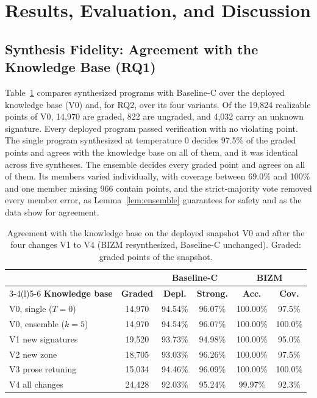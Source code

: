 \documentclass[final,5p]{elsarticle}
\begin{document}
\section{Results, Evaluation, and Discussion}
\label{sec:results_discussion}

\subsection{Synthesis Fidelity: Agreement with the Knowledge Base (RQ1)}
\label{sec:compiled_fidelity}

Table~\ref{tab:agreement} compares synthesized programs with Baseline-C over the deployed knowledge base (V0) and, for RQ2, over its four variants. Of the 19,824 realizable points of V0, 14,970 are graded, 822 are ungraded, and 4,032 carry an unknown signature. Every deployed program passed verification with no violating point. The single program synthesized at temperature 0 decides 97.5\% of the graded points and agrees with the knowledge base on all of them, and it was identical across five syntheses. The ensemble decides every graded point and agrees on all of them. Its members varied individually, with coverage between 69.0\% and 100\% and one member missing 966 contain points, and the strict-majority vote removed every member error, as Lemma~\ref{lem:ensemble} guarantees for safety and as the data show for agreement.

\begin{table}[t]
    \centering
    \caption{Agreement with the knowledge base on the deployed snapshot V0 and after the four changes V1 to V4 (BIZM resynthesized, Baseline-C unchanged). Graded: graded points of the snapshot.}
    \label{tab:agreement}
    \scriptsize
    \setlength{\tabcolsep}{1.8pt}
    \begin{tabular}{@{}lccccc@{}}
        \toprule
        & & \multicolumn{2}{c}{\textbf{Baseline-C}} & \multicolumn{2}{c}{\textbf{BIZM}} \\
        \cmidrule(lr){3-4}\cmidrule(l){5-6}
        \textbf{Knowledge base} & \textbf{Graded} & \textbf{Depl.} & \textbf{Strong.} & \textbf{Acc.} & \textbf{Cov.} \\
        \midrule
        V0, single ($T{=}0$) & 14,970 & 94.54\% & 96.07\% & 100.00\% & 97.5\%  \\
        V0, ensemble ($k{=}5$) & 14,970 & 94.54\% & 96.07\% & 100.00\% & 100.0\% \\
        V1 new signatures            & 19,520 & 93.73\% & 94.98\% & 100.00\% & 95.0\%  \\
        V2 new zone                  & 18,705 & 93.03\% & 96.26\% & 100.00\% & 97.5\%  \\
        V3 prose retuning            & 15,034 & 94.46\% & 96.09\% & 100.00\% & 100.0\% \\
        V4 all changes               & 24,428 & 92.03\% & 95.24\% & 99.97\%  & 92.3\%  \\
        \bottomrule
    \end{tabular}
\end{table}
\end{document}
